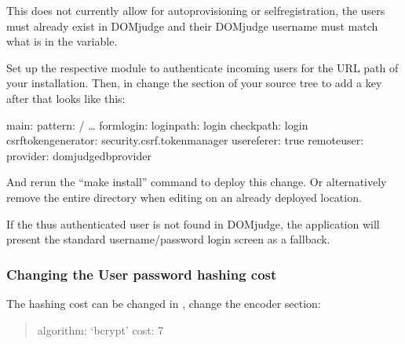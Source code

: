 \documentclass[a4paper,10pt,english,openany]{sphinxmanual}
\begin{document}
\sphinxAtStartPar
This does not currently allow for auto\sphinxhyphen{}provisioning or self\sphinxhyphen{}registration,
the users must already exist in DOMjudge and their DOMjudge username must
match what is in the  variable.

\sphinxAtStartPar
Set up the respective module to authenticate incoming users for the URL
path of your installation. Then, in 
change the  section of your source tree to add a 
key after  that looks like this:

\begin{sphinxVerbatim}[commandchars=\\\{\}]
main:
    pattern: \PYGZca{}/
    …
    form\PYGZus{}login:
        login\PYGZus{}path: login
        check\PYGZus{}path: login
        csrf\PYGZus{}token\PYGZus{}generator: security.csrf.token\PYGZus{}manager
        use\PYGZus{}referer: true
    remote\PYGZus{}user:
        provider: domjudge\PYGZus{}db\PYGZus{}provider
\end{sphinxVerbatim}

\sphinxAtStartPar
And re\sphinxhyphen{}run the “make install” command to deploy this change.
Or alternatively remove the entire  directory when
editing  on an already deployed location.

\sphinxAtStartPar
If the thus authenticated user is not found in DOMjudge, the application
will present the standard username/password login screen as a fallback.


\subsubsection{Changing the User password hashing cost}
\label{\detokenize{config-advanced:changing-the-user-password-hashing-cost}}
\sphinxAtStartPar
The hashing cost can be changed in , change the encoder section:
\begin{quote}
\begin{description}
\begin{description}
\sphinxAtStartPar
algorithm: ‘bcrypt’
cost: 7

\end{description}

\end{description}
\end{quote}
\end{document}

